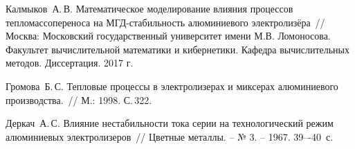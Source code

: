 \begin{vkrthesis}
\begin{vkrreferences}
\item
\label{litlink:kalmykov}
Калмыков~А.\,В.
Математическое моделирование влияния процессов тепломассопереноса на МГД-стабильность алюминиевого электролизёра~// Москва: Московский государственный университет имени М.В. Ломоносова. Факультет вычислительной математики и кибернетики. Кафедра вычислительных методов. Диссертация. 2017 г.

\item
\label{litlink:VAMI}
Громова~Б.\,С.
Тепловые процессы в электролизерах и миксерах алюминиевого производства.~// М.: 1998. С.\,322.

\item
\label{litlink:derkach2}
Деркач~А.\,С.
Влияние нестабильности тока серии на технологический режим алюминиевых электролизеров~// Цветные металлы. – № 3. – 1967. 39–-40~с.
\end{vkrreferences}
\end{vkrthesis}
